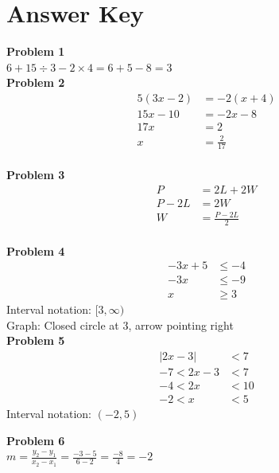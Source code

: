\documentclass[12pt]{article}
\begin{document}
            \newpage

    \section*{Answer Key}

        \textbf{Problem 1}\\
        $6 + 15 \div 3 - 2 \times 4 = 6 + 5 - 8 = 3$\\

        \textbf{Problem 2}\\
        \begin{align*}
        5(3x - 2) &= -2(x + 4)\\
        15x - 10 &= -2x - 8\\
        17x &= 2\\
        x &= \frac{2}{17}
        \end{align*}\\

        \textbf{Problem 3}\\
        \begin{align*}
        P &= 2L + 2W\\
        P - 2L &= 2W\\
        W &= \frac{P - 2L}{2}
        \end{align*}\\

        \textbf{Problem 4}\\
        \begin{align*}
        -3x + 5 &\leq -4\\
        -3x &\leq -9\\
        x &\geq 3
        \end{align*}
        Interval notation: $[3, \infty)$\\
        Graph: Closed circle at 3, arrow pointing right\\

        \textbf{Problem 5}\\
        \begin{align*}
        |2x - 3| &< 7\\
        -7 < 2x - 3 &< 7\\
        -4 < 2x &< 10\\
        -2 < x &< 5
        \end{align*}
        Interval notation: $(-2, 5)$\\

        \newpage

        \textbf{Problem 6}\\
        $m = \displaystyle\frac{y_2 - y_1}{x_2 - x_1} = \frac{-3 - 5}{6 - 2} = \frac{-8}{4} = -2$\\
\end{document}
